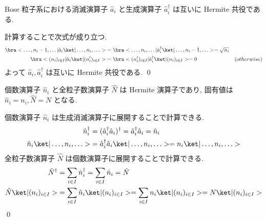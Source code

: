 \documentclass[uplatex,dvipdfmx,a4paper,11pt]{jlreq}
\makeatletter
\numberwithin{equation}{section}
\theoremstyle{definition}
\renewenvironment{proof}[1][\proofname]{\par
  \normalfont
  \topsep6\p@\@plus6\p@ \trivlist
  \item[\hskip\labelsep{\bfseries #1}\@addpunct{\bfseries}]\ignorespaces\quad\par
}{%
  \qed\endtrivlist\@endpefalse
}
\renewcommand\proofname{証明}
\makeatother
\begin{document}
\begin{proposition}[Q21-38]
  Bose 粒子系における消滅演算子 $\hat{a}_i$ と生成演算子 $\hat{a}_i^\dagger$ は互いに Hermite 共役である.
\end{proposition}
\begin{proof}
  計算することで次式が成り立つ.
  \begin{align}
    \bra<\ldots,n_i-1,\ldots|\hat{a}_i\ket|\ldots,n_i,\ldots> & = \bra<\ldots,n_i,\ldots|\hat{a}_i^\dagger\ket|\ldots,n_i-1,\ldots> = \sqrt{n_i}               \\
    \bra<(n_i)_{i\in I}|\hat{a}_i\ket|(n_i')_{i\in I}>        & = \bra<(n_i')_{i\in I}|\hat{a}_i^\dagger\ket|(n_i)_{i\in I}> = 0                 & (otherwise)
  \end{align}
  よって $\hat{a}_i, \hat{a}_i^\dagger$ は互いに Hermite 共役である.
\end{proof}

\begin{proposition}[Q21-39]
  個数演算子 $\hat{n}_i$ と全粒子数演算子 $\hat{N}$ は Hermite 演算子であり, 固有値は $\hat{n}_i = n_i, \hat{N} = N$ となる.
\end{proposition}
\begin{proof}
  個数演算子 $\hat{n}_i$ は生成消滅演算子に展開することで計算できる.
  \begin{align}
    \hat{n}_i^\dagger                & = (\hat{a}_i^\dagger\hat{a}_i)^\dagger = \hat{a}_i^\dagger\hat{a}_i = \hat{n}_i  \\
    \hat{n}_i\ket|\ldots,n_i,\ldots> & = \hat{a}_i^\dagger\hat{a}_i\ket|\ldots,n_i,\ldots> = n_i\ket|\ldots,n_i,\ldots>
  \end{align}
  全粒子数演算子 $\hat{N}$ は個数演算子に展開することで計算できる.
  \begin{align}
    \hat{N}^\dagger             & = \sum_{i\in I}\hat{n}_i^\dagger = \sum_{i\in I}\hat{n}_i = \hat{N}                                         \\
    \hat{N}\ket|(n_i)_{i\in I}> & = \sum_{i\in I}\hat{n}_i\ket|(n_i)_{i\in I}> = \sum_{i\in I}n_i\ket|(n_i)_{i\in I}> = N\ket|(n_i)_{i\in I}>
  \end{align}
\end{proof}
\end{document}
